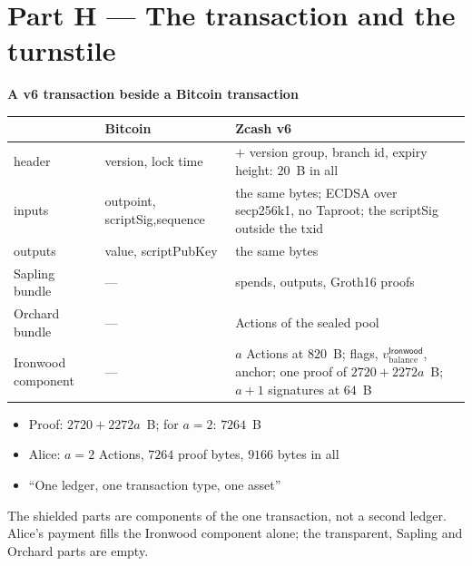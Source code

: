 \documentclass[11pt]{article}
\newcounter{board}
\newenvironment{board}[2]{\clearpage\stepcounter{board}%
  \sbox{\bdlabel}{\small\color{arbdim}#2}%
  \noindent\parbox[b]{\dimexpr\textwidth-\wd\bdlabel-1em\relax}{\raggedright
    \color{arb}\large\bfseries #1}\hfill\usebox{\bdlabel}\par
  \vspace{2pt}{\color{arb!40}\hrule}\vspace{4pt}}{\par}
\newcommand{\shead}[1]{\par\smallskip{\small\bfseries\color{arbdim}#1}\par\nopagebreak}
\newcommand{\Write}{\shead{Write}}
\newcommand{\Say}{\shead{Say}}
\begin{document}
\newcommand{\wbHvb}{\ensuremath{v_{\mathrm{balance}}}}
\newcommand{\wbHvbi}{\ensuremath{v_{\mathrm{balance}}^{\mathsf{Ironwood}}}}
\newcommand{\wbHvbo}{\ensuremath{v_{\mathrm{balance}}^{\mathsf{Orchard}}}}
\newcommand{\wbHd}[1]{\ensuremath{d_{\mathrm{#1}}}}

\section{Part H --- The transaction and the turnstile}

\begin{board}{A v6 transaction beside a Bitcoin transaction}{all four}
{\centering\setlength{\tabcolsep}{4pt}
\begin{tabular}{@{}p{32mm}p{40mm}p{68mm}@{}}
\toprule
 & \textbf{Bitcoin} & \textbf{Zcash v6} \\
\midrule
header & version, lock time & $+$ version group, branch id, expiry
  height: $20$~B in all \\
inputs & outpoint, scriptSig,\newline sequence & the same bytes; ECDSA over
  secp256k1, no Taproot; the scriptSig outside the txid \\
outputs & value, scriptPubKey & the same bytes \\
Sapling bundle & --- & spends, outputs, Groth16 proofs \\
Orchard bundle & --- & Actions of the sealed pool \\
Ironwood \mbox{component} & --- & $a$ Actions at $820$~B; flags, \wbHvbi,
  anchor; one proof of $2720 + 2272a$~B; $a + 1$ signatures at $64$~B \\
\bottomrule
\end{tabular}\par}
\clearpage
\Write
\begin{itemize}
  \item Proof: $2720 + 2272a$~B; for $a = 2$: $7264$~B
  \item Alice: $a = 2$ Actions, $7264$ proof bytes, $9166$ bytes in all
  \item ``One ledger, one transaction type, one asset''
\end{itemize}
\Say
The shielded parts are components of the one transaction, not a second
ledger. Alice's payment fills the Ironwood component alone; the
transparent, Sapling and Orchard parts are empty.
\end{board}
\end{document}
